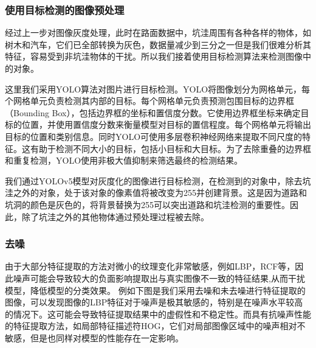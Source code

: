 \documentclass[a4paper, 10pt]{article}
\begin{document}
	\subsubsection{使用目标检测的图像预处理}
	
	经过上一步对图像灰度处理，此时在路面数据中，坑洼周围有各种各样的物体，如树木和汽车，它们已全部转换为灰色，数据量减少到三分之一但是我们很难分析其特征，容易受到非坑洼物体的干扰。所以我们接着使用目标检测算法来检测图像中的对象。
	
	这里我们采用YOLO算法对图片进行目标检测。YOLO将图像划分为网格单元，每个网格单元负责检测其内部的目标。每个网格单元负责预测包围目标的边界框（Bounding Box），包括边界框的坐标和置信度分数。它使用边界框坐标来确定目标的位置，并使用置信度分数来衡量模型对目标的置信程度。每个网格单元将输出目标的位置和类别信息。同时YOLO可使用多层卷积神经网络来提取不同尺度的特征。这有助于检测不同大小的目标，包括小目标和大目标。为了去除重叠的边界框和重复检测，YOLO使用非极大值抑制来筛选最终的检测结果。
	
	我们通过YOLOv5模型对灰度化的图像进行目标检测，在检测到的对象中，除去坑洼之外的对象，处于该对象的像素值将被改变为255并创建背景。这是因为道路和坑洞的颜色是灰色的，将背景替换为255可以突出道路和坑洼检测的重要性。因此，除了坑洼之外的其他物体通过预处理过程被去除。
	
	
	\subsubsection{去噪}
	
	由于大部分特征提取的方法对微小的纹理变化非常敏感，例如LBP，RCF等，因此噪声可能会导致较大的负面影响提取出与真实图像不一致的特征结果,从而干扰模型，降低模型的分类效果。
	例如下图是我们采用去噪和未去噪进行特征提取的图像，可以发现图像的LBP特征对于噪声是极其敏感的，特别是在噪声水平较高的情况下。这可能会导致特征提取结果中的虚假性和不稳定性。而具有抗噪声性能的特征提取方法，如局部特征描述符HOG，它们对局部图像区域中的噪声相对不敏感，但是也同样对模型的性能存在一定影响。
	
\end{document}
